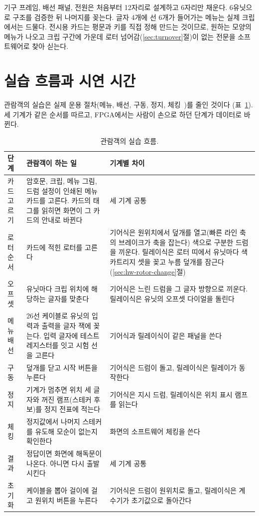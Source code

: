 기구 프레임, 배선 패널, 전원은 처음부터 12자리로 설계하고 6자리만 채운다. 6유닛으로 구조를 검증한 뒤 나머지를
꽂는다. 글자 4개에 선 6개가 들어가는 메뉴는 실제 크립에서는 드물다. 전시용 카드는 평문과 키를 직접 정해
만드는 것이므로, 원하는 모양의 메뉴가 나오고 크립 구간에 가운데 로터 넘어감(\ref{sec:turnover}절)이 없는
전문을 소프트웨어로 찾아 싣는다.

\section{실습 흐름과 시연 시간}\label{sec:hw-flow}

관람객의 실습은 실제 운용 절차(메뉴, 배선, 구동, 정지, 체킹~\cite{us6812report1944})를 줄인 것이다
(표~\ref{tab:hw-flow}). 세 기계가 같은 순서를 따르고, FPGA에서는 사람이 손으로 하던 단계가 데이터로 바뀐다.

\begin{table}[ht]
\centering
\caption{관람객의 실습 흐름.}
\label{tab:hw-flow}
\small
\begin{tabularx}{\linewidth}{>{\raggedright\arraybackslash}p{19mm}>{\raggedright\arraybackslash}X>{\raggedright\arraybackslash}X}
\toprule
단계 & 관람객이 하는 일 & 기계별 차이 \\
\midrule
카드 고르기 & 암호문, 크립, 메뉴 그림, 드럼 설정이 인쇄된 메뉴 카드를 고른다. 카드의 태그를 읽히면 화면이
  그 카드의 안내로 바뀐다 & 세 기계 공통 \\
로터 순서 & 카드에 적힌 로터를 고른다 & 기어식은 원위치에서 덮개를 열고(빠른 라인 축의 브레이크가 축을 잡는다)
  색으로 구분한 드럼을 끼운다. 릴레이식은 로터 띠에서 유닛마다 색 카트리지 셋을 꽂고 누름 덮개를 잠근다
  (\ref{sec:hw-rotor-change}절) \\
오프셋 & 유닛마다 크립 위치에 해당하는 글자를 맞춘다 & 기어식은 느린 드럼을 그 글자 방향으로 끼운다.
  릴레이식은 유닛의 오프셋 다이얼을 돌린다 \\
메뉴 배선 & 26선 케이블로 유닛의 입력과 출력을 글자 잭에 꽂는다. 입력 글자에 테스트 레지스터를 잇고 시험
  선을 고른다 & 기어식과 릴레이식이 같은 패널을 쓴다 \\
구동 & 덮개를 닫고 시작 버튼을 누른다 & 기어식은 드럼이 돌고, 릴레이식은 릴레이가 동작한다 \\
정지 & 기계가 멈추면 위치 세 글자와 꺼진 램프(스테커 후보)를 정지 전표에 적는다 & 기어식은 지시 드럼,
  릴레이식은 위치 표시 램프를 읽는다 \\
체킹 & 정지값에서 나머지 스테커를 유도해 모순이 없는지 확인한다 & 화면의 소프트웨어 체킹을 쓴다 \\
결과 & 정답이면 화면에 해독문이 나온다. 아니면 다시 출발시킨다 & 세 기계 공통 \\
초기화 & 케이블을 뽑아 걸이에 걸고 원위치 버튼을 누른다 & 기어식은 드럼이 원위치로 돌고, 릴레이식은 계수기가
  초기값으로 돌아간다 \\
\bottomrule
\end{tabularx}
\end{table}

